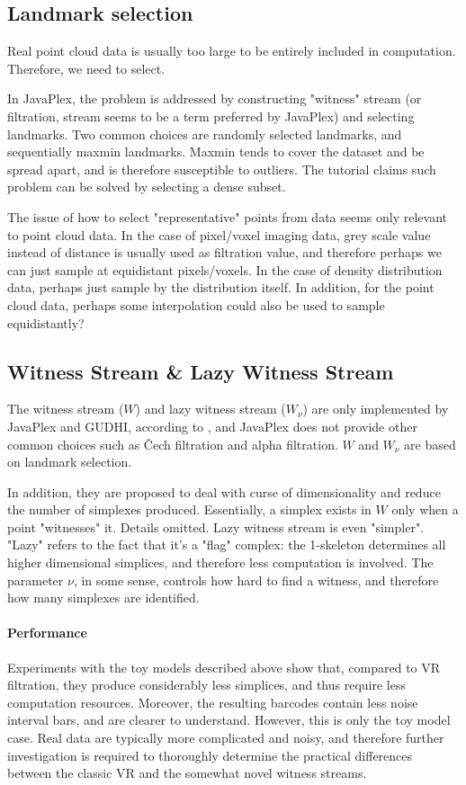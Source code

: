 \documentclass[10pt,a4paper]{article}
\begin{document}
\subsection{Landmark selection}
Real point cloud data is usually too large to be entirely included in computation. Therefore, we need to select.\par
In JavaPlex, the problem is addressed by constructing "witness" stream (or filtration, stream seems to be a term preferred by JavaPlex) and selecting landmarks. Two common choices are randomly selected landmarks, and sequentially maxmin landmarks. Maxmin tends to cover the dataset and be spread apart, and is therefore susceptible to outliers. The tutorial claims such problem can be solved by selecting a dense subset. \par
The issue of how to select "representative" points from data seems only relevant to point cloud data. In the case of pixel/voxel imaging data, grey scale value instead of distance is usually used as filtration value, and therefore perhaps we can just sample at equidistant pixels/voxels. In the case of density distribution data, perhaps just sample by the distribution itself. In addition, for the point cloud data, perhaps some interpolation could also be used to sample equidistantly?\par

\subsection{Witness Stream \& Lazy Witness Stream}
The witness stream ($W$) and lazy witness stream ($W_{\nu}$) are only implemented by JavaPlex and GUDHI, according to \cite{Otter2017}, and JavaPlex does not provide other common choices such as \v Cech filtration and alpha filtration. $W$ and $W_{\nu}$ are based on landmark selection.\par
In addition, they are proposed to deal with curse of dimensionality and reduce the number of simplexes produced. Essentially, a simplex exists in $W$ only when a point "witnesses" it. Details omitted. Lazy witness stream is even "simpler". "Lazy" refers to the fact that it's a "flag" complex: the 1-skeleton determines all higher dimensional simplices, and therefore less computation is involved. The parameter $\nu$, in some sense, controls how hard to find a witness, and therefore how many simplexes are identified.
\paragraph{Performance} Experiments with the toy models described above show that, compared to VR filtration, they produce considerably less simplices, and thus require less computation resources. Moreover, the resulting barcodes contain less noise interval bars, and are clearer to understand. However, this is only the toy model case. Real data are typically more complicated and noisy, and therefore further investigation is required to thoroughly determine the practical differences between the classic VR and the somewhat novel witness streams.
\end{document}
